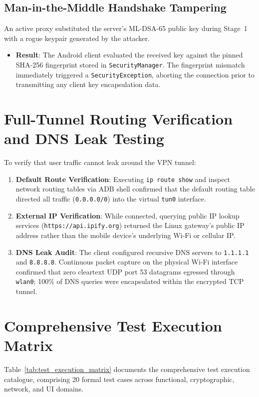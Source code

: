 \subsection{Man-in-the-Middle Handshake Tampering}
An active proxy substituted the server's ML-DSA-65 public key during Stage~1 with a rogue keypair generated by the attacker.
\begin{itemize}
    \item \textbf{Result}: The Android client evaluated the received key against the pinned SHA-256 fingerprint stored in \texttt{SecurityManager}. The fingerprint mismatch immediately triggered a \texttt{SecurityException}, aborting the connection prior to transmitting any client key encapsulation data.
\end{itemize}

\section{Full-Tunnel Routing Verification and DNS Leak Testing}
\label{sec:dns_leak_routing_testing}

To verify that user traffic cannot leak around the VPN tunnel:
\begin{enumerate}
    \item \textbf{Default Route Verification}: Executing \texttt{ip route show} and inspect network routing tables via ADB shell confirmed that the default routing table directed all traffic (\texttt{0.0.0.0/0}) into the virtual \texttt{tun0} interface.
    \item \textbf{External IP Verification}: While connected, querying public IP lookup services (\texttt{https://api.ipify.org}) returned the Linux gateway's public IP address rather than the mobile device's underlying Wi-Fi or cellular IP.
    \item \textbf{DNS Leak Audit}: The client configured recursive DNS servers to \texttt{1.1.1.1} and \texttt{8.8.8.8}. Continuous packet capture on the physical Wi-Fi interface confirmed that zero cleartext UDP port 53 datagrams egressed through \texttt{wlan0}; 100\% of DNS queries were encapsulated within the encrypted TCP tunnel.
\end{enumerate}

\section{Comprehensive Test Execution Matrix}
\label{sec:comprehensive_test_matrix}

Table~\ref{tab:test_execution_matrix} documents the comprehensive test execution catalogue, comprising 20 formal test cases across functional, cryptographic, network, and UI domains.

